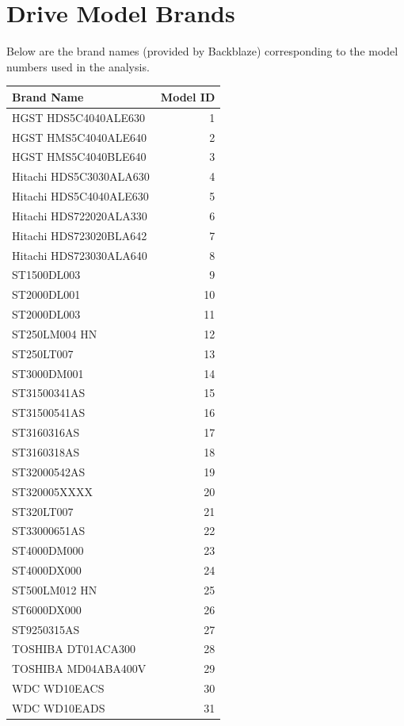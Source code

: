 \documentclass[12pt]{article}
\begin{document}
\section{Drive Model Brands}
Below are the brand names (provided by Backblaze) corresponding to
the model numbers used in the analysis.
\begin{table}[H]
\centering
\begin{tabular}{lr}
  \hline
Brand Name & Model ID \\ 
  \hline
HGST HDS5C4040ALE630 &   1 \\ 
  HGST HMS5C4040ALE640 &   2 \\ 
  HGST HMS5C4040BLE640 &   3 \\ 
  Hitachi HDS5C3030ALA630 &   4 \\ 
  Hitachi HDS5C4040ALE630 &   5 \\ 
  Hitachi HDS722020ALA330 &   6 \\ 
  Hitachi HDS723020BLA642 &   7 \\ 
  Hitachi HDS723030ALA640 &   8 \\ 
  ST1500DL003 &   9 \\ 
  ST2000DL001 &  10 \\ 
  ST2000DL003 &  11 \\ 
  ST250LM004 HN &  12 \\ 
  ST250LT007 &  13 \\ 
  ST3000DM001 &  14 \\ 
  ST31500341AS &  15 \\ 
  ST31500541AS &  16 \\ 
  ST3160316AS &  17 \\ 
  ST3160318AS &  18 \\ 
  ST32000542AS &  19 \\ 
  ST320005XXXX &  20 \\ 
  ST320LT007 &  21 \\ 
  ST33000651AS &  22 \\ 
  ST4000DM000 &  23 \\ 
  ST4000DX000 &  24 \\ 
  ST500LM012 HN &  25 \\ 
  ST6000DX000 &  26 \\ 
  ST9250315AS &  27 \\ 
  TOSHIBA DT01ACA300 &  28 \\ 
  TOSHIBA MD04ABA400V &  29 \\ 
  WDC WD10EACS &  30 \\ 
  WDC WD10EADS &  31 \\ 

\end{tabular}
\end{table}
\end{document}
